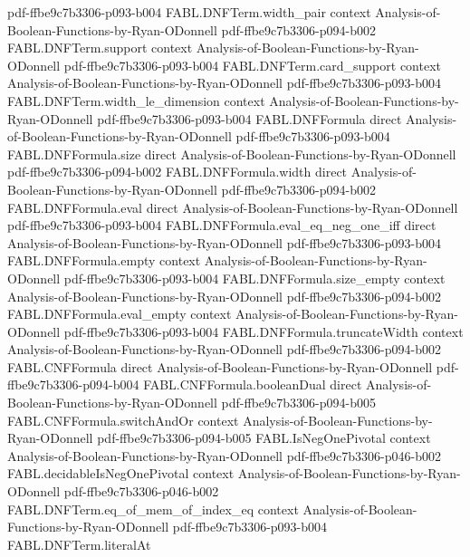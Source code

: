 \begin{theorem}
  {pdf-ffbe9c7b3306-p093-b004}
\proofstep
  {FABL.DNFTerm.width_pair}
  {context}
  {Analysis-of-Boolean-Functions-by-Ryan-ODonnell}
  {pdf-ffbe9c7b3306-p094-b002}
\proofstep
  {FABL.DNFTerm.support}
  {context}
  {Analysis-of-Boolean-Functions-by-Ryan-ODonnell}
  {pdf-ffbe9c7b3306-p093-b004}
\proofstep
  {FABL.DNFTerm.card_support}
  {context}
  {Analysis-of-Boolean-Functions-by-Ryan-ODonnell}
  {pdf-ffbe9c7b3306-p093-b004}
\proofstep
  {FABL.DNFTerm.width_le_dimension}
  {context}
  {Analysis-of-Boolean-Functions-by-Ryan-ODonnell}
  {pdf-ffbe9c7b3306-p093-b004}
\proofstep
  {FABL.DNFFormula}
  {direct}
  {Analysis-of-Boolean-Functions-by-Ryan-ODonnell}
  {pdf-ffbe9c7b3306-p093-b004}
\proofstep
  {FABL.DNFFormula.size}
  {direct}
  {Analysis-of-Boolean-Functions-by-Ryan-ODonnell}
  {pdf-ffbe9c7b3306-p094-b002}
\proofstep
  {FABL.DNFFormula.width}
  {direct}
  {Analysis-of-Boolean-Functions-by-Ryan-ODonnell}
  {pdf-ffbe9c7b3306-p094-b002}
\proofstep
  {FABL.DNFFormula.eval}
  {direct}
  {Analysis-of-Boolean-Functions-by-Ryan-ODonnell}
  {pdf-ffbe9c7b3306-p093-b004}
\proofstep
  {FABL.DNFFormula.eval_eq_neg_one_iff}
  {direct}
  {Analysis-of-Boolean-Functions-by-Ryan-ODonnell}
  {pdf-ffbe9c7b3306-p093-b004}
\proofstep
  {FABL.DNFFormula.empty}
  {context}
  {Analysis-of-Boolean-Functions-by-Ryan-ODonnell}
  {pdf-ffbe9c7b3306-p093-b004}
\proofstep
  {FABL.DNFFormula.size_empty}
  {context}
  {Analysis-of-Boolean-Functions-by-Ryan-ODonnell}
  {pdf-ffbe9c7b3306-p094-b002}
\proofstep
  {FABL.DNFFormula.eval_empty}
  {context}
  {Analysis-of-Boolean-Functions-by-Ryan-ODonnell}
  {pdf-ffbe9c7b3306-p093-b004}
\proofstep
  {FABL.DNFFormula.truncateWidth}
  {context}
  {Analysis-of-Boolean-Functions-by-Ryan-ODonnell}
  {pdf-ffbe9c7b3306-p094-b002}
\proofstep
  {FABL.CNFFormula}
  {direct}
  {Analysis-of-Boolean-Functions-by-Ryan-ODonnell}
  {pdf-ffbe9c7b3306-p094-b004}
\proofstep
  {FABL.CNFFormula.booleanDual}
  {direct}
  {Analysis-of-Boolean-Functions-by-Ryan-ODonnell}
  {pdf-ffbe9c7b3306-p094-b005}
\proofstep
  {FABL.CNFFormula.switchAndOr}
  {context}
  {Analysis-of-Boolean-Functions-by-Ryan-ODonnell}
  {pdf-ffbe9c7b3306-p094-b005}
\proofstep
  {FABL.IsNegOnePivotal}
  {context}
  {Analysis-of-Boolean-Functions-by-Ryan-ODonnell}
  {pdf-ffbe9c7b3306-p046-b002}
\proofstep
  {FABL.decidableIsNegOnePivotal}
  {context}
  {Analysis-of-Boolean-Functions-by-Ryan-ODonnell}
  {pdf-ffbe9c7b3306-p046-b002}
\proofstep
  {FABL.DNFTerm.eq_of_mem_of_index_eq}
  {context}
  {Analysis-of-Boolean-Functions-by-Ryan-ODonnell}
  {pdf-ffbe9c7b3306-p093-b004}
\proofstep
  {FABL.DNFTerm.literalAt}

\end{theorem}
